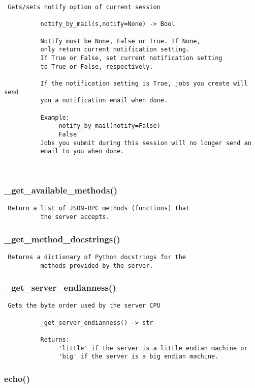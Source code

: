 \begin{verbatim}
 Gets/sets notify option of current session
         
          notify_by_mail(s,notify=None) -> Bool

          Notify must be None, False or True. If None,
          only return current notification setting.
          If True or False, set current notification setting
          to True or False, respectively.

          If the notification setting is True, jobs you create will send
          you a notification email when done. 
          
          Example:
               notify_by_mail(notify=False)
               False
          Jobs you submit during this session will no longer send an
          email to you when done.
          
          
\end{verbatim}
\subsubsection{\_get\_available\_methods()}


\begin{verbatim}
 Return a list of JSON-RPC methods (functions) that
          the server accepts. 
\end{verbatim}
\subsubsection{\_get\_method\_docstrings()}


\begin{verbatim}
 Returns a dictionary of Python docstrings for the
          methods provided by the server. 
\end{verbatim}
\subsubsection{\_get\_server\_endianness()}


\begin{verbatim}
 Gets the byte order used by the server CPU 
          
          _get_server_endianness() -> str

          Returns:
               'little' if the server is a little endian machine or
               'big' if the server is a big endian machine.
\end{verbatim}
\subsubsection{echo()}


